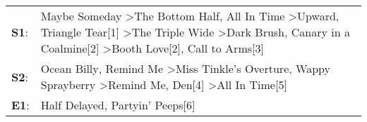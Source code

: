 \begin{supertabular}{p{0.03\textwidth}p{0.92\textwidth}}
 \textbf{S1}:  &  Maybe Someday\textsuperscript{} \textgreater \enspace The Bottom Half\textsuperscript{}, \enspace All In Time\textsuperscript{} \textgreater \enspace Upward\textsuperscript{}, \enspace Triangle Tear[1]\textsuperscript{} \textgreater \enspace The Triple Wide\textsuperscript{} \textgreater \enspace Dark Brush\textsuperscript{}, \enspace Canary in a Coalmine[2]\textsuperscript{} \textgreater \enspace Booth Love[2]\textsuperscript{}, \enspace Call to Arms[3]\textsuperscript{}  \enspace  \\
 \textbf{S2}:  &                                                                                                                                                                   Ocean Billy\textsuperscript{}, \enspace Remind Me\textsuperscript{} \textgreater \enspace Miss Tinkle's Overture\textsuperscript{}, \enspace Wappy Sprayberry\textsuperscript{} \textgreater \enspace Remind Me\textsuperscript{}, \enspace Den[4]\textsuperscript{} \textgreater \enspace All In Time[5]\textsuperscript{}  \enspace  \\
 \textbf{E1}:  &                                                                                                                                                                                                                                                                                                                                                                                                                  Half Delayed\textsuperscript{}, \enspace Partyin' Peeps[6]\textsuperscript{}  \enspace  \\
\end{supertabular}
